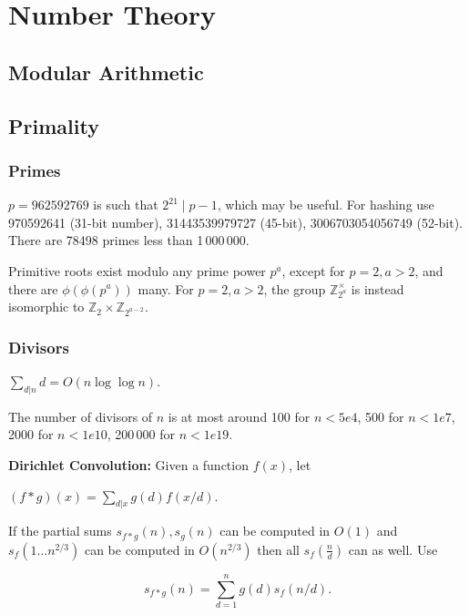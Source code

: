 \chapter{Number Theory}

\section{Modular Arithmetic}

\section{Primality}
	\subsection{Primes}
	$p=962592769$ is such that $2^{21} \mid p-1$, which may be useful. For hashing
	use 970592641 (31-bit number), 31443539979727 (45-bit), 3006703054056749
	(52-bit). There are 78498 primes less than 1\,000\,000.

	Primitive roots exist modulo any prime power $p^a$, except for $p = 2, a > 2$, and there are $\phi(\phi(p^a))$ many.
	For $p = 2, a > 2$, the group $\mathbb Z_{2^a}^\times$ is instead isomorphic to $\mathbb Z_2 \times \mathbb Z_{2^{a-2}}$.

	\subsection{Divisors}
	$\sum_{d|n} d = O(n \log \log n)$.

	The number of divisors of $n$ is at most around 100 for $n < 5e4$, 500 for $n < 1e7$, 2000 for $n < 1e10$, 200\,000 for $n < 1e19$.

	\textbf{Dirichlet Convolution:} Given a function $f(x)$, let 

	$(f*g)(x)=\sum_{d|x}g(d)f(x/d)$. 

	If the partial sums $s_{f*g}(n),s_g(n)$ can be computed in $O(1)$ and $s_f(1\ldots n^{2/3})$ can be computed in $O\left(n^{2/3}\right)$ then all $s_f\left(\frac{n}{d}\right)$ can as well. Use

	$$s_{f*g}(n)=\sum_{d=1}^ng(d)s_f(n/d).$$ 

	
